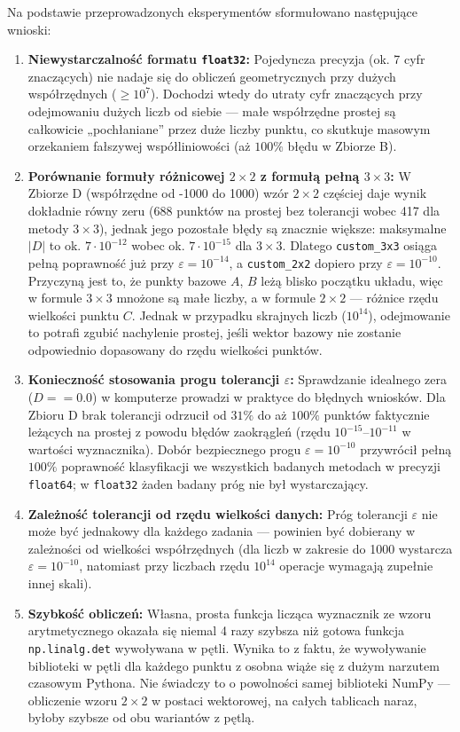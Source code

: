 \documentclass[10pt,a4paper]{article}
\begin{document}
Na podstawie przeprowadzonych eksperymentów sformułowano następujące wnioski:
\begin{enumerate}
    \item \textbf{Niewystarczalność formatu \texttt{float32}:} Pojedyncza precyzja (ok. 7 cyfr znaczących) nie nadaje się do obliczeń geometrycznych przy dużych współrzędnych ($\ge 10^7$). Dochodzi wtedy do utraty cyfr znaczących przy odejmowaniu dużych liczb od siebie --- małe współrzędne prostej są całkowicie „pochłaniane” przez duże liczby punktu, co skutkuje masowym orzekaniem fałszywej współliniowości (aż $100\%$ błędu w Zbiorze B).
    \item \textbf{Porównanie formuły różnicowej $2 \times 2$ z formułą pełną $3 \times 3$:} W Zbiorze D (współrzędne od -1000 do 1000) wzór $2 \times 2$ częściej daje wynik dokładnie równy zeru (688 punktów na prostej bez tolerancji wobec 417 dla metody $3 \times 3$), jednak jego pozostałe błędy są znacznie większe: maksymalne $|D|$ to ok. $7 \cdot 10^{-12}$ wobec ok. $7 \cdot 10^{-15}$ dla $3 \times 3$. Dlatego \texttt{custom\_3x3} osiąga pełną poprawność już przy $\varepsilon = 10^{-14}$, a \texttt{custom\_2x2} dopiero przy $\varepsilon = 10^{-10}$. Przyczyną jest to, że punkty bazowe $A$, $B$ leżą blisko początku układu, więc w formule $3 \times 3$ mnożone są małe liczby, a w formule $2 \times 2$ --- różnice rzędu wielkości punktu $C$. Jednak w przypadku skrajnych liczb ($10^{14}$), odejmowanie to potrafi zgubić nachylenie prostej, jeśli wektor bazowy nie zostanie odpowiednio dopasowany do rzędu wielkości punktów.
    \item \textbf{Konieczność stosowania progu tolerancji $\varepsilon$:} Sprawdzanie idealnego zera ($D == 0.0$) w komputerze prowadzi w praktyce do błędnych wniosków. Dla Zbioru D brak tolerancji odrzucił od $31\%$ do aż $100\%$ punktów faktycznie leżących na prostej z powodu błędów zaokrągleń (rzędu $10^{-15}$--$10^{-11}$ w wartości wyznacznika). Dobór bezpiecznego progu $\varepsilon = 10^{-10}$ przywrócił pełną $100\%$ poprawność klasyfikacji we wszystkich badanych metodach w precyzji \texttt{float64}; w \texttt{float32} żaden badany próg nie był wystarczający.
    \item \textbf{Zależność tolerancji od rzędu wielkości danych:} Próg tolerancji $\varepsilon$ nie może być jednakowy dla każdego zadania --- powinien być dobierany w zależności od wielkości współrzędnych (dla liczb w zakresie do 1000 wystarcza $\varepsilon = 10^{-10}$, natomiast przy liczbach rzędu $10^{14}$ operacje wymagają zupełnie innej skali).
    \item \textbf{Szybkość obliczeń:} Własna, prosta funkcja licząca wyznacznik ze wzoru arytmetycznego okazała się niemal 4 razy szybsza niż gotowa funkcja \texttt{np.linalg.det} wywoływana w pętli. Wynika to z faktu, że wywoływanie biblioteki w pętli dla każdego punktu z osobna wiąże się z dużym narzutem czasowym Pythona. Nie świadczy to o powolności samej biblioteki NumPy --- obliczenie wzoru $2 \times 2$ w postaci wektorowej, na całych tablicach naraz, byłoby szybsze od obu wariantów z pętlą.
\end{enumerate}
\end{document}
